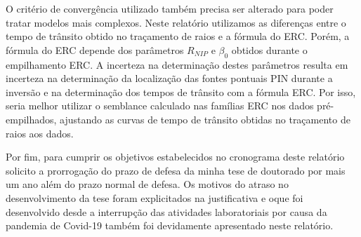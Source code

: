 O critério de convergência utilizado também precisa ser alterado para poder tratar modelos mais complexos.
Neste relatório utilizamos as diferenças entre o tempo de trânsito obtido no traçamento de raios e a fórmula
do ERC. Porém, a fórmula do ERC depende dos parâmetros $R_{NIP}$ e $\beta_0$ obtidos durante o empilhamento ERC.
A incerteza na determinação destes parâmetros resulta em incerteza na determinação da localização das fontes
pontuais PIN durante a inversão e na determinação dos tempos de trânsito com a fórmula ERC. Por isso, seria
melhor utilizar o semblance calculado nas famílias ERC nos dados pré-empilhados, ajustando as curvas de tempo
de trânsito obtidas no traçamento de raios aos dados.

Por fim, para cumprir os objetivos estabelecidos no cronograma deste relatório solicito a prorrogação do prazo de defesa da minha tese de doutorado por mais um ano além do prazo normal de defesa. Os motivos do atraso no 
desenvolvimento da tese foram explicitados na justificativa e oque foi desenvolvido desde a interrupção
das atividades laboratoriais por causa da pandemia de Covid-19 também foi devidamente apresentado neste relatório.
